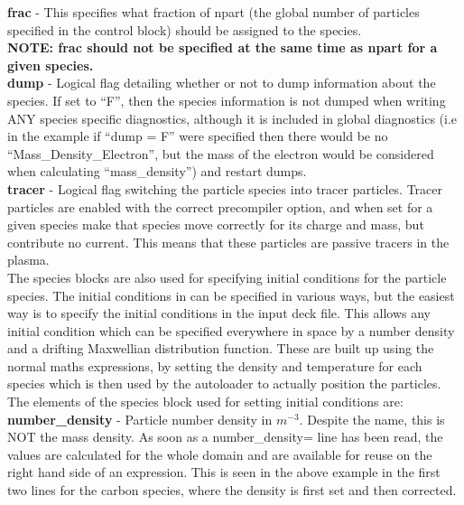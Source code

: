 \documentclass[12pt,a4paper]{article}
\newcommand{\emphtext}{\color{warwickdark} \fontfamily{phv}\selectfont\large\bf}
\newcommand{\EPOCH}{{\color{warwickdark}\fontfamily{phv}\selectfont{EPOCH}}}
\begin{document}
{\emphtext frac} - This specifies what fraction of npart (the
global number of particles specified in the control block) should be assigned
to the species.\\

{\emphtext NOTE: frac should not be specified at the same time as npart for a
given species.}\\

{\emphtext dump} - Logical flag detailing whether or not to dump
information about the species. If set to ``F'', then the species information
is not dumped when writing ANY species specific diagnostics, although it is
included in global diagnostics (i.e in the example if ``dump = F'' were
specified then there would be no ``Mass\_Density\_Electron'', but the mass of
the electron would be considered when calculating ``mass\_density'') and
restart dumps.\\

{\emphtext tracer} - Logical flag switching the particle species
into tracer particles. Tracer particles are enabled with the correct
precompiler option, and when set for a given species make that species move
correctly for its charge and mass, but contribute no current. This means that
these particles are passive tracers in the plasma.\\

The species blocks are also used for specifying initial conditions for
the particle species. The initial conditions in {\EPOCH} can be specified in
various ways, but the easiest way is to specify the initial conditions in the
input deck file. This allows any initial condition which can be specified
everywhere in space by a number density and a drifting Maxwellian distribution
function.
These are built up using the normal maths
expressions, by setting the density and temperature for each species which is
then used by the autoloader to actually position the particles. \\
The elements of the species block used for setting
initial conditions are:\\

{\emphtext number\_density} - Particle number density in $m^{-3}$. Despite the name, this
is NOT the mass density. As soon as a number\_density= line has been read, the values are
calculated for the whole domain and are available for reuse on the right hand
side of an expression. This is seen in the above example in the first two lines
for the carbon species, where the density is first set and then corrected.\\
\end{document}
